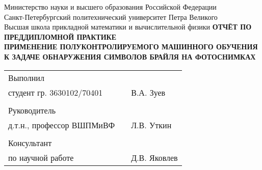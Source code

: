 \documentclass{main.tex}[subfiles]
\begin{document}
\begin{titlepage}
\begin{center}
    Министерство науки и высшего образования Российской Федерации \\
    Санкт-Петербургский политехнический университет Петра Великого \\
    Высшая школа прикладной математики и вычислительной физики
    \vfill
    \Large{\textbf{ОТЧЁТ ПО ПРЕДДИПЛОМНОЙ ПРАКТИКЕ}} \\
    \vspace{.7\baselineskip}
    \Large{\textbf{
            ПРИМЕНЕНИЕ ПОЛУКОНТРОЛИРУЕМОГО МАШИННОГО ОБУЧЕНИЯ \\
            К ЗАДАЧЕ ОБНАРУЖЕНИЯ СИМВОЛОВ БРАЙЛЯ НА ФОТОСНИМКАХ}}
\end{center}

\vfill

\begin{tabular}{ l p{} l }
    Выполнил & & \\
    студент гр. 3630102/70401 & & В.А. Зуев \\
    & & \\
    Руководитель & & \\
    д.т.н., профессор ВШПМиВФ & & Л.В. Уткин\\
    & & \\
    Консультант & & \\
    по научной работе & & Д.В. Яковлев\\
\end{tabular}

\vfill

\end{titlepage}
\end{document}
